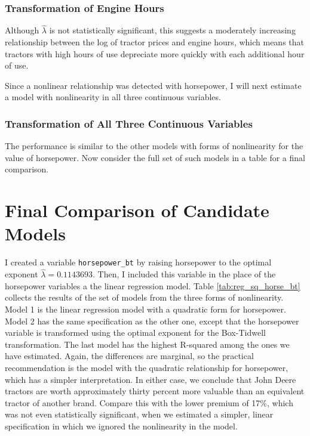 \documentclass[11pt]{paper}
\begin{document}
\subsubsection{Transformation of Engine Hours}




Although $\hat{\lambda}$ is not statistically significant,
this suggests a moderately increasing relationship
between the log of tractor prices and engine hours,
which means that tractors with high hours of use
depreciate more quickly with each additional hour of use.

Since a nonlinear relationship was detected with horsepower,
I will next estimate a model
with nonlinearity in all three continuous variables.


\subsubsection{Transformation of All Three Continuous Variables}





The performance is similar to the other models with
forms of nonlinearity for the value of horsepower.
Now consider the full set of such models in a table for a final comparison.


\pagebreak
\section{Final Comparison of Candidate Models}

I created a variable \texttt{horsepower\_bt}
by raising horsepower to the optimal exponent 
$\hat{\lambda} = 0.1143693$. 
Then, I included this variable in the place of 
the horsepower variables a the linear regression model.
% 
Table \ref{tab:reg_sq_horse_bt} collects the results
of the set of models from the three forms of nonlinearity.
Model 1 is the linear regression model with 
a quadratic form for horsepower. 
Model 2 
has the same specification as the other one, 
except that the horsepower variable is transformed using the optimal
exponent for the Box-Tidwell transformation. 
% 
The last model has the highest R-squared
among the ones we have estimated.
Again, the differences are marginal, so the practical recommendation
is the model with the quadratic relationship for horsepower, 
which has a simpler interpretation.
In either case, we conclude that John Deere tractors are worth
approximately thirty percent more valuable
than an equivalent tractor of another brand. 
Compare this with the lower premium of 17\%, 
which was not even statistically significant, 
when we estimated a simpler, linear specification
in which we ignored the nonlinearity in the model. 





\end{document}
